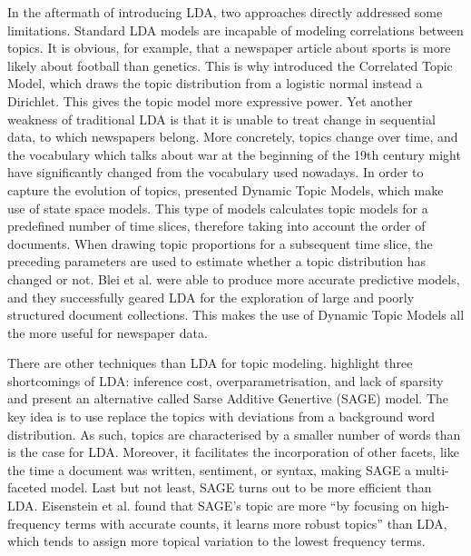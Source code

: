 In the aftermath of introducing LDA, two approaches directly addressed some limitations. Standard LDA models are incapable of modeling correlations between topics. It is obvious, for example, that a newspaper article about sports is more likely about football than genetics. This is why \citet{Blei:2005:CTM:2976248.2976267} introduced the Correlated Topic Model, which draws the topic distribution from a logistic normal instead a Dirichlet. This gives the topic model more expressive power. Yet another weakness of traditional LDA is that it is unable to treat change in sequential data, to which newspapers belong. More concretely, topics change over time, and the vocabulary which talks about war at the beginning of the 19th century might have significantly changed from the vocabulary used nowadays. In order to capture the evolution of topics, \citet{bleidynamic2006} presented Dynamic Topic Models, which make use of state space models. This type of models calculates topic models for a predefined number of time slices, therefore taking into account the order of documents. When drawing topic proportions for a subsequent time slice, the preceding parameters are used to estimate whether a topic distribution has changed or not. Blei et al. were able to produce more accurate predictive models, and they successfully geared LDA for the exploration of large and poorly structured document collections. This makes the use of Dynamic Topic Models all the more useful for newspaper data. 

There are other techniques than LDA for topic modeling. \citet{EisensteinAX11} highlight three shortcomings of LDA: inference cost, overparametrisation, and lack of sparsity and present an alternative called Sarse Additive Genertive (SAGE) model. The key idea is to use  replace the topics with deviations from a background word distribution. As such, topics are characterised by a smaller number of words than is the case for LDA. Moreover, it facilitates the incorporation of other facets, like the time a document was written, sentiment, or syntax, making SAGE a multi-faceted model. Last but not least, SAGE turns out to be more efficient than LDA. Eisenstein et al. found that SAGE's topic are more ``by focusing on high-frequency terms with accurate counts, it learns more robust topics'' than LDA, which tends to assign more topical variation to the lowest frequency terms.

